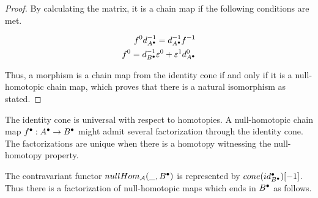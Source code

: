 \begin{proof}
        By calculating the matrix, it is a chain map if the following conditions are met.

        \begin{align*}
            f^0d^{-1}_{A^{\bullet}} = d^{-1}_{A^{\bullet}}f^{-1} \\
            f^0 = d^{-1}_{B^{\bullet}}\varepsilon^0 + \varepsilon^1d^0_{A^{\bullet}}
        \end{align*}

        Thus, a morphism is a chain map from the identity cone if and only if it is a null-homotopic chain map, which proves that there is a natural isomorphism as stated.
    \end{proof}

    \begin{remark}
        The identity cone is universal with respect to homotopies. A null-homotopic chain map $f^{\bullet}:A^{\bullet}\rightarrow B^{\bullet}$ might admit several factorization through the identity cone. The factorizations are unique when there is a homotopy witnessing the null-homotopy property.
        \begin{center}
        \end{center}
    \end{remark}

    \begin{corollary}
        The contravariant functor $nullHom_{\mathcal{A}}(\_,B^{\bullet})$ is represented by $cone(id_{B^{\bullet}}^{\bullet})[-1]$. Thus there is a factorization of null-homotopic maps which ends in $B^{\bullet}$ as follows.

        \begin{center}
        \end{center}
    \end{corollary}

